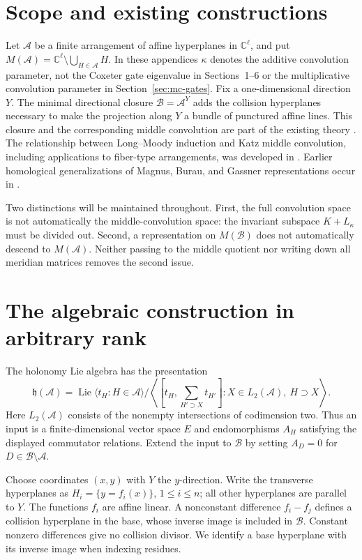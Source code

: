 \documentclass[11pt,a4paper]{article}
\theoremstyle{remark}\newtheorem{remark}[theorem]{Remark}
\newcommand{\C}{\mathbb C}
\newcommand{\A}{\mathcal A}
\newcommand{\B}{\mathcal B}
\newcommand{\h}{\mathfrak h}
\begin{document}
\section{Scope and existing constructions}\label{sec:general-arrangement}
Let $\A$ be a finite arrangement of affine hyperplanes in $\C^\ell$, and put
$M(\A)=\C^\ell\setminus\bigcup_{H\in\A}H$.
In these appendices $\kappa$ denotes the additive convolution parameter,
not the Coxeter gate eigenvalue in Sections~1--6 or the
multiplicative convolution parameter in Section~\ref{sec:mc-gates}.
Fix a one-dimensional direction $Y$.  The minimal directional closure
$\B=\A^Y$ adds the collision hyperplanes necessary to make the projection
along $Y$ a bundle of punctured affine lines.  This closure and the
corresponding middle convolution are part of the existing theory
\cite{AH,Hiroe}.  The relationship between Long--Moody induction and Katz
middle convolution, including applications to fiber-type arrangements,
was developed in \cite{HN}.  Earlier homological generalizations of
Magnus, Burau, and Gassner representations occur in \cite{CS}.

Two distinctions will be maintained throughout.  First, the full convolution
space is not automatically the middle-convolution space: the invariant
subspace $K+L_\kappa$ must be divided out.  Second, a representation on
$M(\B)$ does not automatically descend to $M(\A)$.  Neither passing to the
middle quotient nor writing down all meridian matrices removes the second
issue.

\section{The algebraic construction in arbitrary rank}
The holonomy Lie algebra has the presentation
\begin{equation}\label{eq:holonomy}
\h(\A)=\operatorname{Lie}\langle t_H:H\in\A\rangle\big/
\left\langle\left[t_H,\sum_{H'\supset X}t_{H'}\right]:
 X\in L_2(\A),\ H\supset X\right\rangle .
\end{equation}
Here $L_2(\A)$ consists of the nonempty intersections of codimension two.
Thus an input is a finite-dimensional vector space $E$ and endomorphisms
$A_H$ satisfying the displayed commutator relations.  Extend the input to
$\B$ by setting $A_D=0$ for $D\in\B\setminus\A$.

Choose coordinates $(x,y)$ with $Y$ the $y$-direction.  Write the transverse
hyperplanes as $H_i=\{y=f_i(x)\}$, $1\leq i\leq n$; all other hyperplanes
are parallel to $Y$.  The functions $f_i$ are affine linear.  A nonconstant
difference $f_i-f_j$ defines a collision hyperplane in the base, whose
inverse image is included in $\B$.  Constant nonzero differences give no
collision divisor.  We identify a base hyperplane with its inverse image
when indexing residues.
\end{document}
